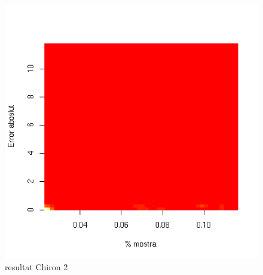 \documentclass[titlepage,a4paper,12pt]{book}
\begin{document}
	\begin{figure}[tbp]
		\begin{center}
			\includegraphics[scale=0.75]{chiron/rgrau2.png}
		\end{center}
		\caption{resultat Chiron 2}
		\label{fig:resChir2}
	\end{figure}
\end{document}
